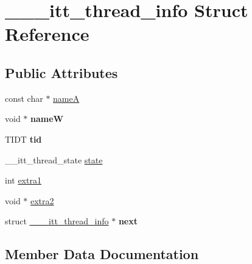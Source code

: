 \hypertarget{struct______itt__thread__info}{}\section{\+\_\+\+\_\+\+\_\+itt\+\_\+thread\+\_\+info Struct Reference}
\label{struct______itt__thread__info}
\subsection*{Public Attributes}
\begin{DoxyCompactItemize}
\item 
const char $\ast$ \hyperlink{struct______itt__thread__info_af0d071b9ab2b86c040a6de800f92cb30}{name\+A}
\item 
\hypertarget{struct______itt__thread__info_a607067bccd38bfb17c9f7c8676caf03d}{}void $\ast$ {\bfseries name\+W}\label{struct______itt__thread__info_a607067bccd38bfb17c9f7c8676caf03d}

\item 
\hypertarget{struct______itt__thread__info_adfe992c44e507418c56b509c9c985393}{}T\+I\+D\+T {\bfseries tid}\label{struct______itt__thread__info_adfe992c44e507418c56b509c9c985393}

\item 
\+\_\+\+\_\+itt\+\_\+thread\+\_\+state \hyperlink{struct______itt__thread__info_a6f6f3ed5a462461cc8dc05b650e331ba}{state}
\item 
int \hyperlink{struct______itt__thread__info_a24093b12fcbe313abcf61c449d42d66c}{extra1}
\item 
void $\ast$ \hyperlink{struct______itt__thread__info_a29a043e53a66cc89b62b11f0ad8e7588}{extra2}
\item 
\hypertarget{struct______itt__thread__info_a1c1665afb537536190a66931a94ccae8}{}struct \hyperlink{struct______itt__thread__info}{\+\_\+\+\_\+\+\_\+itt\+\_\+thread\+\_\+info} $\ast$ {\bfseries next}\label{struct______itt__thread__info_a1c1665afb537536190a66931a94ccae8}

\end{DoxyCompactItemize}


\subsection{Member Data Documentation}
\hypertarget{struct______itt__thread__info_a24093b12fcbe313abcf61c449d42d66c}{}
